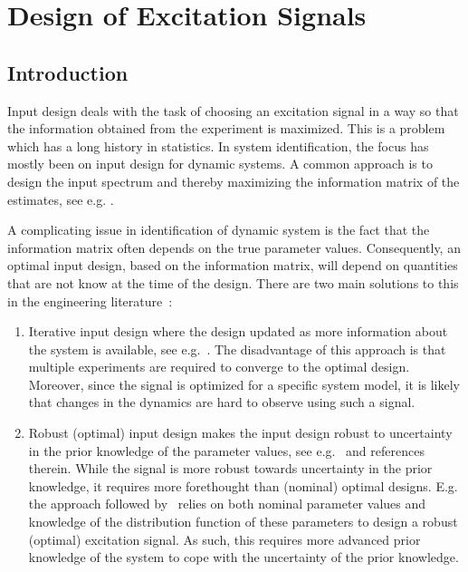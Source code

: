 \chapter{Design of Excitation Signals}
\label{sec:excitation}
\def\thisDir{ch02-qlogms}

\section{Introduction}
\label{sec:excitation:intro}
Input design deals with the task of choosing an excitation signal in a way so that the information obtained from the experiment is maximized. 
This is a problem which has a long history in statistics. 
In system identification, the focus has mostly been on input design for dynamic systems.
A common approach is to design the input spectrum and thereby maximizing the information matrix of the estimates, see e.g. \citep{Fedorov1972,Goodwin1977}.

A complicating issue in identification of dynamic system is the fact that the information matrix often depends on the true parameter values. 
Consequently, an optimal input design, based on the information matrix, will depend on quantities that are not know at the time of the design.
There are two main solutions to this in the engineering literature~\citep{Goodwin2006GBO}:
\begin{enumerate}
\item Iterative input design where the design updated as more information about the system is available, see e.g.~\citep{Hjalmarsson2005,Gevers2005}.
The disadvantage of this approach is that multiple experiments are required to converge to the optimal design.
Moreover, since the signal is optimized for a specific system model, it is likely that changes in the dynamics are hard to observe using such a signal.

\item Robust (optimal) input design makes the input design robust to uncertainty in the prior knowledge of the parameter values, see e.g.~\citep{Rojas2007,Goodwin2006GBO,Rojas2012} and references therein. 
While the signal is more robust towards uncertainty in the prior knowledge, it requires more forethought than (nominal) optimal designs.
E.g. the approach followed by~\citet{Rojas2007} relies on both nominal parameter values and  knowledge of the distribution function of these parameters to design a robust (optimal) excitation signal.
As such, this requires more advanced prior knowledge of the system to cope with the uncertainty of the prior knowledge.
\end{enumerate}

